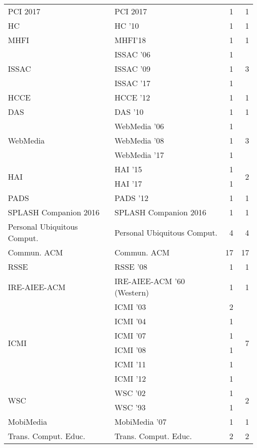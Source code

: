 \begin{table*}[t]
\begin{tabular}{llrr}
\multirow{1}{*}{PCI 2017} & PCI 2017 & 1 & \multirow{1}{*}{1}\\
\multirow{1}{*}{HC } & HC '10 & 1 & \multirow{1}{*}{1}\\
\multirow{1}{*}{MHFI} & MHFI'18 & 1 & \multirow{1}{*}{1}\\
\multirow{3}{*}{ISSAC } & ISSAC '06 & 1 & \multirow{3}{*}{3}\\
& ISSAC '09 & 1 &\\
& ISSAC '17 & 1 &\\
\multirow{1}{*}{HCCE } & HCCE '12 & 1 & \multirow{1}{*}{1}\\
\multirow{1}{*}{DAS } & DAS '10 & 1 & \multirow{1}{*}{1}\\
\multirow{3}{*}{WebMedia } & WebMedia '06 & 1 & \multirow{3}{*}{3}\\
& WebMedia '08 & 1 &\\
& WebMedia '17 & 1 &\\
\multirow{2}{*}{HAI } & HAI '15 & 1 & \multirow{2}{*}{2}\\
& HAI '17 & 1 &\\
\multirow{1}{*}{PADS } & PADS '12 & 1 & \multirow{1}{*}{1}\\
\multirow{1}{*}{SPLASH Companion 2016} & SPLASH Companion 2016 & 1 & \multirow{1}{*}{1}\\
\multirow{1}{*}{Personal Ubiquitous Comput.} & Personal Ubiquitous Comput. & 4 & \multirow{1}{*}{4}\\
\multirow{1}{*}{Commun. ACM} & Commun. ACM & 17 & \multirow{1}{*}{17}\\
\multirow{1}{*}{RSSE } & RSSE '08 & 1 & \multirow{1}{*}{1}\\
\multirow{1}{*}{IRE-AIEE-ACM } & IRE-AIEE-ACM '60 (Western) & 1 & \multirow{1}{*}{1}\\
\multirow{6}{*}{ICMI } & ICMI '03 & 2 & \multirow{6}{*}{7}\\
& ICMI '04 & 1 &\\
& ICMI '07 & 1 &\\
& ICMI '08 & 1 &\\
& ICMI '11 & 1 &\\
& ICMI '12 & 1 &\\
\multirow{2}{*}{WSC } & WSC '02 & 1 & \multirow{2}{*}{2}\\
& WSC '93 & 1 &\\
\multirow{1}{*}{MobiMedia } & MobiMedia '07 & 1 & \multirow{1}{*}{1}\\
\multirow{1}{*}{Trans. Comput. Educ.} & Trans. Comput. Educ. & 2 & \multirow{1}{*}{2}\\

\end{tabular}
\end{table*}

